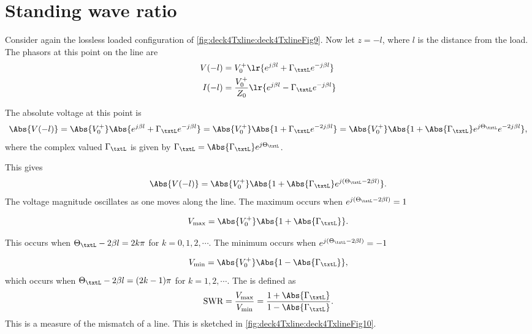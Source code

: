 \section{Standing wave ratio}
Consider again the lossless loaded configuration of \cref{fig:deck4Txline:deck4TxlineFig9}.  Now let \( z = - l \), where \( l \) is the distance from the load.  The phasors at this point on the line are
\begin{equation}\label{eqn:uwaves4TransmissionLines:1100}
\begin{aligned}
V(-l) &= V_0^{+} \lr{ e^{j \beta l} + \Gamma_\txtL e^{-j \beta l} } \\
I(-l) &= \frac{V_0^{+}}{Z_0} \lr{ e^{j \beta l} - \Gamma_\txtL  e^{-j \beta l} } \\
\end{aligned}
\end{equation}

The absolute voltage at this point is
\begin{dmath}\label{eqn:uwaves4TransmissionLines:1120}
\Abs{V(-l)}
= \Abs{V_0^{+}} \Abs{ e^{j \beta l} + \Gamma_\txtL e^{-j \beta l} }
= \Abs{V_0^{+}} \Abs{ 1 + \Gamma_\txtL e^{-2 j \beta l} }
= \Abs{V_0^{+}} \Abs{ 1 + \Abs{\Gamma_\txtL} e^{j \Theta_\txtL} e^{-2 j \beta l} },
\end{dmath}
where the complex valued \( \Gamma_\txtL \) is given by \( \Gamma_\txtL = \Abs{\Gamma_\txtL} e^{j \Theta_\txtL} \).

This gives
\begin{equation}\label{eqn:uwaves4TransmissionLines:1140}
\Abs{V(-l)}
= \Abs{V_0^{+}} \Abs{ 1 + \Abs{\Gamma_\txtL} e^{j(\Theta_\txtL -2 \beta l)} }.
\end{equation}
The voltage magnitude oscillates as one moves along the line.  The maximum occurs when \( e^{j (\Theta_\txtL -2 \beta l)}  = 1 \)

\begin{equation}\label{eqn:uwaves4TransmissionLines:1160}
V_{\mathrm{max}} = \Abs{V_0^{+}} \Abs{ 1 + \Abs{\Gamma_\txtL} }.
\end{equation}

This occurs when \( \Theta_\txtL - 2 \beta l = 2 k \pi \) for \( k = 0, 1, 2, \cdots \).  The minimum occurs when \( e^{j (\Theta_\txtL -2 \beta l)}  = -1 \)

\begin{equation}\label{eqn:uwaves4TransmissionLines:1180}
V_{\mathrm{min}} = \Abs{V_0^{+}} \Abs{ 1 - \Abs{\Gamma_\txtL} },
\end{equation}
which occurs when \( \Theta_\txtL - 2 \beta l = (2 k - 1 )\pi \) for \( k = 1, 2, \cdots \).  The  is defined as
\begin{equation}\label{eqn:uwaves4TransmissionLines:1200}
\textrm{SWR} = \frac{V_{\mathrm{max}}}{V_{\mathrm{min}}} = \frac{ 1 + \Abs{\Gamma_\txtL} }{ 1 - \Abs{\Gamma_\txtL} }.
\end{equation}
This is a measure of the mismatch of a line.  This is sketched in \cref{fig:deck4Txline:deck4TxlineFig10}.

